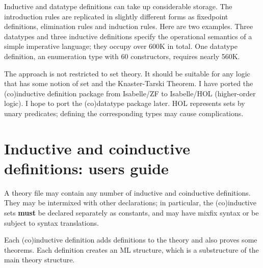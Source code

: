Inductive and datatype definitions can take up considerable storage.  The
introduction rules are replicated in slightly different forms as fixedpoint
definitions, elimination rules and induction rules.  Here are two examples.
Three datatypes and three inductive definitions specify the operational
semantics of a simple imperative language; they occupy over 600K in total.
One datatype definition, an enumeration type with 60 constructors, requires
nearly 560K\@.

The approach is not restricted to set theory.  It should be suitable for
any logic that has some notion of set and the Knaster-Tarski Theorem.  I
have ported the (co)inductive definition package from Isabelle/ZF to
Isabelle/HOL (higher-order logic).  I hope to port the (co)datatype package
later.  HOL represents sets by unary predicates; defining the corresponding
types may cause complications.





\ifCADE{}
\else
\newpage
\appendix
\section{Inductive and coinductive definitions: users guide}
A theory file may contain any number of inductive and coinductive
definitions.  They may be intermixed with other declarations; in
particular, the (co)inductive sets {\bf must} be declared separately as
constants, and may have mixfix syntax or be subject to syntax translations.

Each (co)inductive definition adds definitions to the theory and also
proves some theorems.  Each definition creates an ML structure, which is a
substructure of the main theory structure.

